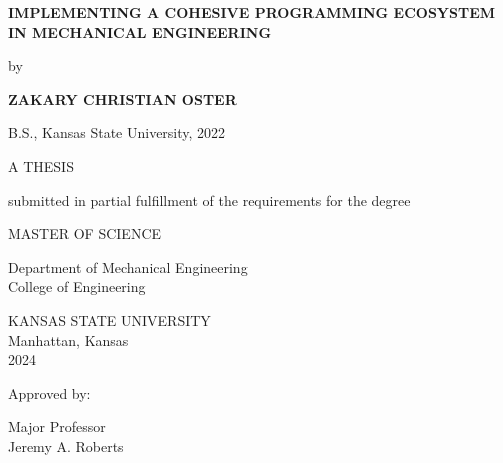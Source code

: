 \begin{titlepage}
    \begin{center}
 
        \textbf{IMPLEMENTING A COHESIVE PROGRAMMING ECOSYSTEM IN MECHANICAL ENGINEERING}
        
        \vspace{1cm}
         by
             
        \vspace{1cm}
        \textbf{ZAKARY CHRISTIAN OSTER}
 
        \vspace{1cm}
        B.S., Kansas State University, 2022
             
        \vspace{1cm}
        A THESIS
             
        \vspace{1cm}
        submitted in partial fulfillment of the requirements for the degree
 
        \vspace{1cm}
        MASTER OF SCIENCE
 
        \vspace{1cm}
        Department of Mechanical Engineering\\
        College of Engineering
      
        \vspace{1.5cm}
             
        KANSAS STATE UNIVERSITY\\
        Manhattan, Kansas\\
        2024
    \end{center}
 
    \begin{flushright}
        Approved by:
 
        \vspace{1.5cm}
        Major Professor\\
        Jeremy A. Roberts
    \end{flushright}
 \end{titlepage}